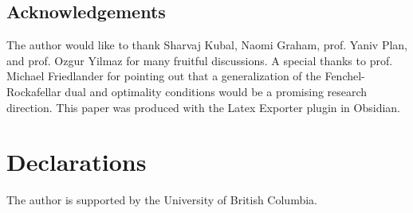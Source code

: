 \documentclass{article}
\theoremstyle{plain}
\theoremstyle{definition}
\theoremstyle{remark}
\begin{document}
\subsection{Acknowledgements}
\label{loc:body.proofs.acknowledgements}
The author would like to thank Sharvaj Kubal, Naomi Graham, prof. Yaniv Plan, and prof.
Ozgur Yilmaz for many fruitful discussions. A special thanks to prof. Michael Friedlander for 
pointing out that a generalization of the Fenchel-Rockafellar dual and
optimality conditions would be
a promising research direction. This paper was produced with the Latex Exporter plugin in Obsidian.
\section*{Declarations}
The author is supported by the University of British Columbia.
\printbibliography
\end{document}
